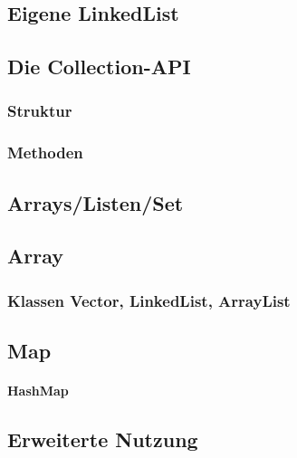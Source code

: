 \label{sec:java_datenstrukturen}


\subsection{Eigene LinkedList}

\subsection{Die Collection-API}
	
	\subsubsection{Struktur}
	
	\subsubsection{Methoden}

\subsection{Arrays/Listen/Set}
	
	\subsection{Array}
	
	\subsubsection{Klassen Vector, LinkedList, ArrayList}

\subsection{Map}
	
	\paragraph{HashMap}

\subsection{Erweiterte Nutzung}
	
